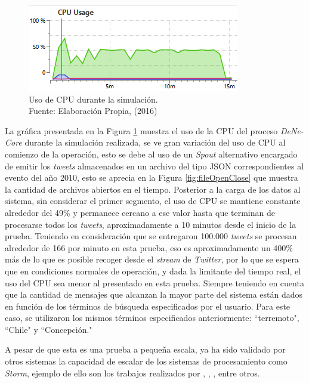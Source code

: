 \begin{figure}[H]
        \centering
        \captionsetup{justification=centering}
        \includegraphics[scale=1.2]{images/CPUUsageN.png}
        \caption[Uso de CPU durante la simulación.]{Uso de CPU durante la simulación.\\Fuente: Elaboración Propia, (2016)}
        \label{fig:cpuUsage}
\end{figure}

La gráfica presentada en la Figura \ref{fig:cpuUsage} muestra el uso de la CPU del proceso \textit{DeNe-Core} durante la simulación realizada, se ve gran variación del uso de CPU al comienzo de la operación, esto se debe al uso de un \textit{Spout} alternativo encargado de emitir los \textit{tweets} almacenados en un archivo del tipo JSON correspondientes al evento del año 2010, esto se aprecia en la Figura \ref{fig:fileOpenClose} que muestra la cantidad de archivos abiertos en el tiempo. Posterior a la carga de los datos al sistema, sin considerar el primer segmento, el uso de CPU se mantiene constante alrededor del 49\% y permanece cercano a ese valor hasta que terminan de procesarse todos los \textit{tweets}, aproximadamente a 10 minutos desde el inicio de la prueba. Teniendo en consideración que se entregaron 100.000 \textit{tweets} se procesan alrededor de 166 por minuto en esta prueba, eso es aproximadamente un 400\% más de lo que es posible recoger desde el \textit{stream} de \textit{Twitter}, por lo que se espera que en condiciones normales de operación, y dada la limitante del tiempo real, el uso del CPU sea menor al presentado en esta prueba. Siempre teniendo en cuenta que la cantidad de mensajes que alcanzan la mayor parte del sistema están dados en función de los términos de búsqueda especificados por el usuario. Para este caso, se utilizaron los mismos términos especificados anteriormente: ``terremoto", ``Chile" y ``Concepción."

A pesar de que esta es una prueba a pequeña escala, ya ha sido validado por otros sistemas la capacidad de escalar de los sistemas de procesamiento como \textit{Storm}, ejemplo de ello son los trabajos realizados por \citep{WladdimiroElastic}, \citep{sclnStorm}, \citep{HowSpotifyScalesStorm}, entre otros.

